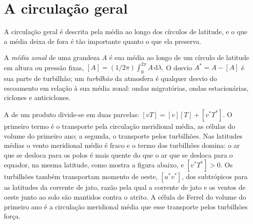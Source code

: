\section{A circulação geral}\label{sec:b3:atmospheric-dynamics:general-circulation}

A circulação geral é descrita pela média ao longo dos círculos de latitude,
e o que a média deixa de fora é tão importante quanto o que ela preserva.

\begin{definition}\label{def:b3:atmospheric-dynamics:eddy}
A \emph{média zonal} de uma grandeza $A$ é sua média
ao longo de um círculo de latitude em altura ou pressão fixas, $[A] =
(1/2\pi)\int_0^{2\pi} A\,\mathrm d\lambda$. O desvio $A^* = A - [A]$
é sua parte de turbilhão; um \emph{turbilhão} da
atmosfera é qualquer desvio do escoamento em relação à sua média zonal: ondas migratórias,
ondas estacionárias, ciclones e anticiclones.
\end{definition}

A  de um produto divide-se em duas parcelas: $[vT] = [v][T] + [v^*T^*]$. O
primeiro termo é o transporte pela circulação meridional média, as células
do volume do primeiro ano; a segunda, o transporte pelos turbilhões. Nas
latitudes médias o vento meridional médio é fraco e o termo dos turbilhões
domina: o ar que se desloca para os polos é mais quente do que o ar que se desloca para o equador, na
mesma latitude, como mostra a figura abaixo, e $[v^*T^*] > 0$. Os turbilhões também
transportam momento de oeste, $[u^*v^*]$, dos subtrópicos para as latitudes
da corrente de jato, razão pela qual a corrente de jato e os ventos de oeste junto ao solo são
mantidos contra o atrito. A célula de Ferrel do volume do primeiro ano é a
circulação meridional média que esse transporte pelos turbilhões força.

